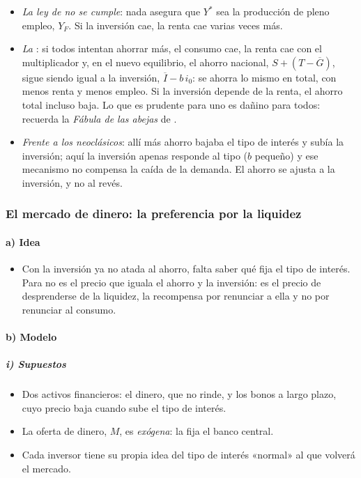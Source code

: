 \documentclass[11pt]{article}
\begin{document}
\begin{itemize}
\item \emph{La ley de  no se cumple}: nada asegura que $Y^*$ sea la producción de pleno empleo, $Y_F$. Si la inversión cae, la renta cae varias veces más.
\item \emph{La }: si todos intentan ahorrar más, el consumo cae, la renta cae con el multiplicador y, en el nuevo equilibrio, el ahorro nacional, $S+(T-\overline{G})$, sigue siendo igual a la inversión, $\overline{I}-b\,i_0$: se ahorra lo mismo en total, con menos renta y menos empleo. Si la inversión depende de la renta, el ahorro total incluso baja. Lo que es prudente para uno es dañino para todos:  recuerda la \emph{Fábula de las abejas} de \nocite{Keynes1936}.
\item \emph{Frente a los neoclásicos}: allí más ahorro bajaba el tipo de interés y subía la inversión; aquí la inversión apenas responde al tipo ($b$ pequeño) y ese mecanismo no compensa la caída de la demanda. El ahorro se ajusta a la inversión, y no al revés.
\end{itemize}

\subsubsection{El mercado de dinero: la preferencia por la liquidez}\label{sec:dinero}

\paragraph{a) Idea}

\begin{itemize}
\item Con la inversión ya no atada al ahorro, falta saber qué fija el tipo de interés. Para  no es el precio que iguala el ahorro y la inversión: es el precio de desprenderse de la liquidez, la recompensa por renunciar a ella y no por renunciar al consumo\nocite{Keynes1936}.
\end{itemize}

\paragraph{b) Modelo}

\subparagraph{i) Supuestos}

\begin{itemize}
\item Dos activos financieros: el dinero, que no rinde, y los bonos a largo plazo, cuyo precio baja cuando sube el tipo de interés.
\item La oferta de dinero, $M$, es \emph{exógena}: la fija el banco central.
\item Cada inversor tiene su propia idea del tipo de interés «normal» al que volverá el mercado.
\end{itemize}
\end{document}

